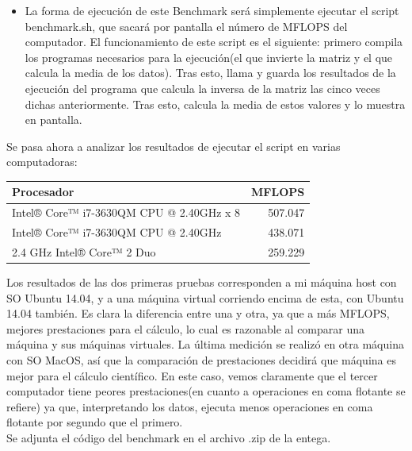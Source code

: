 \begin{itemize}
\begin{itemize}
		\item La forma de ejecución de este Benchmark será simplemente ejecutar el script benchmark.sh, que sacará por pantalla el número de MFLOPS del computador. El funcionamiento de este script es el siguiente: primero compila los programas necesarios para la ejecución(el que invierte la matriz y el que calcula la media de los datos). Tras esto, llama y guarda los resultados de la ejecución del programa que calcula la inversa de la matriz las cinco veces dichas anteriormente. Tras esto, calcula la media de estos valores y lo muestra en pantalla.
	\end{itemize}
	
	Se pasa ahora a analizar los resultados de ejecutar el script en varias computadoras:\\
	
	\begin{center}
		\begin{tabular}{| l || r | }
			\hline
			Procesador & MFLOPS\\ \hline \hline
			Intel® Core™ i7-3630QM CPU @ 2.40GHz x 8  & 507.047 \\ \hline
			Intel® Core™ i7-3630QM CPU @ 2.40GHz & 438.071	\\ \hline
			2.4 GHz Intel® Core™ 2 Duo & 259.229 \\
			\hline
		\end{tabular}
	\end{center}
	
	Los resultados de las dos primeras pruebas corresponden a mi máquina host con SO Ubuntu 14.04, y a una máquina virtual corriendo encima de esta, con Ubuntu 14.04 también. Es clara la diferencia entre una y otra, ya que a más MFLOPS, mejores prestaciones para el cálculo, lo cual es razonable al comparar una máquina y sus máquinas virtuales. La última medición se realizó en otra máquina con SO MacOS, así que la comparación de prestaciones decidirá que máquina es mejor para el cálculo científico. En este caso, vemos claramente que el tercer computador tiene peores prestaciones(en cuanto a operaciones en coma flotante se refiere) ya que, interpretando los datos, ejecuta menos operaciones en coma flotante por segundo que el primero. \\
	
	Se adjunta el código del benchmark en el archivo .zip de la entega.
	
\end{itemize}



\newpage

